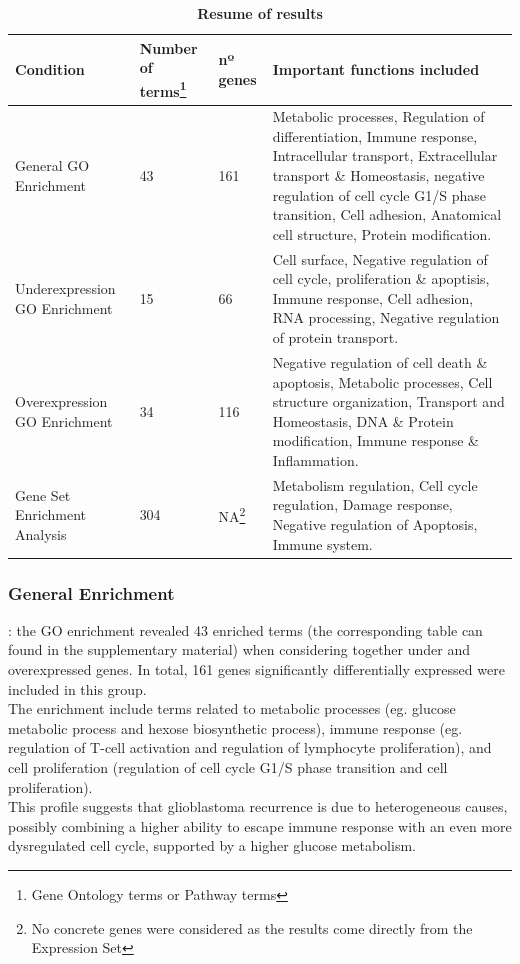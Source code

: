 \documentclass[9pt,twocolumn,twoside]{gsajnl}
\begin{document}
\begin{table}[!htbp]
\centering
\caption{\bf Resume of results}
\begin{tableminipage}{\textwidth}
\begin{tabularx}{\textwidth}{m{3.4cm}m{2.6cm}m{1.5cm}m{9.2cm}}
\hline
Condition & Number of terms\footnote{Gene Ontology terms or Pathway terms} & nº genes & Important functions included\\
\hline

General GO Enrichment & 43 & 161 & Metabolic processes, Regulation of differentiation, Immune response, Intracellular transport, Extracellular transport \& Homeostasis, negative regulation of cell cycle G1/S phase transition, Cell adhesion, Anatomical cell structure, Protein modification. \\

Underexpression GO Enrichment & 15 & 66 & Cell surface, Negative regulation of cell cycle, proliferation \& apoptisis, Immune response, Cell adhesion, RNA processing, Negative regulation of protein transport.\\

Overexpression GO Enrichment & 34 & 116 & Negative regulation of cell death \& apoptosis, Metabolic processes, Cell structure organization, Transport and Homeostasis, DNA \& Protein modification, Immune response \& Inflammation.\\

Gene Set Enrichment Analysis & 304 & NA\footnote{No concrete genes were considered as the results come directly from the Expression Set} & Metabolism regulation, Cell cycle regulation, Damage response, Negative regulation of Apoptosis, Immune system. \\

\hline
\end{tabularx}
  \label{tab:resume}
\end{tableminipage}
\end{table}

\subsubsection*{General Enrichment}: the GO enrichment revealed 43 enriched terms (the corresponding table can found in the supplementary material) when considering together under and overexpressed genes. In total, 161 genes significantly differentially expressed were included in this group.\\
The enrichment include terms related to metabolic processes (eg. glucose metabolic process and hexose biosynthetic process), immune response (eg. regulation of T-cell activation and regulation of lymphocyte proliferation), and cell proliferation (regulation of cell cycle G1/S phase transition and cell proliferation).\\
This profile suggests that glioblastoma recurrence is due to heterogeneous causes, possibly combining a higher ability to escape immune response with an even more dysregulated cell cycle, supported by a higher glucose metabolism.
\end{document}
